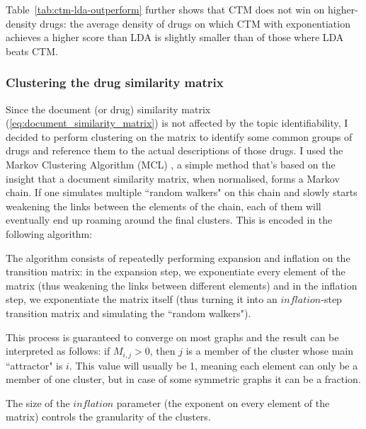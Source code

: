 \documentclass[12pt,a4paper,twoside,openright]{report}
\begin{document}
Table~\ref{tab:ctm-lda-outperform} further shows that CTM does not win on higher-density drugs: the average density of drugs on which CTM with exponentiation achieves a higher score than LDA is slightly smaller than of those where LDA beats CTM.

\subsubsection{Clustering the drug similarity matrix}
Since the document (or drug) similarity matrix (\ref{eq:document_similarity_matrix}) is not affected by the topic identifiability, I decided to perform clustering on the matrix to identify some common groups of drugs and reference them to the actual descriptions of those drugs.
I used the Markov Clustering Algorithm (MCL)  \cite{Dongen:2000:CAG:868986}, a simple method that's based on the insight that a document similarity matrix, when normalised, forms a Markov chain. If one simulates multiple ``random walkers" on this chain and slowly starts weakening the links between the elements of the chain, each of them will eventually end up roaming around the final clusters. This is encoded in the following algorithm:



The algorithm consists of repeatedly performing expansion and inflation on the transition matrix: in the expansion step, we exponentiate every element of the matrix (thus weakening the links between different elements) and in the inflation step, we exponentiate the matrix itself (thus turning it into an $\mathit{inflation}$-step transition matrix and simulating the ``random walkers").

This process is guaranteed to converge on most graphs and the result can be interpreted as follows: if $M_{i,j} > 0$, then $j$ is a member of the cluster whose main ``attractor" is $i$. This value will usually be 1, meaning each element can only be a member of one cluster, but in case of some symmetric graphs it can be a fraction.

The size of the $\mathit{inflation}$ parameter (the exponent on every element of the matrix) controls the granularity of the clusters.
\end{document}
